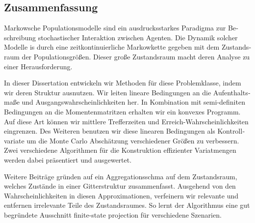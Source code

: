 \begin{otherlanguage}{ngerman}
\chapter*{Zusammenfassung}
Markowsche Populationsmodelle sind ein ausdrucksstarkes Paradigma zur Beschreibung stochastischer Interaktion zwischen Agenten.
Die Dynamik solcher Modelle is durch eine zeitkontinuierliche Markowkette gegeben mit dem Zustandsraum der Populationsgrößen.
Dieser große Zustandsraum macht deren Analyse zu einer Herausforderung.

In dieser Dissertation entwickeln wir Methoden für diese Problemklasse, indem wir deren Struktur ausnutzen.
Wir leiten lineare Bedingungen an die Aufenthaltsmaße und Ausgangswahrscheinlichkeiten her.
In Kombination mit semi-definiten Bedingungen an die Momentenmatritzen erhalten wir ein konvexes Programm.
Auf diese Art können wir mittlere Trefferzeiten und Erreich-Wahrscheinlichkeiten eingrenzen.
Des Weiteren benutzen wir diese linearen Bedingungen als Kontrollvariate um die Monte Carlo Abschätzung verschiedener Größen zu verbessern.
Zwei verschiedene Algorithmen für die Konstruktion effizienter Variatmengen werden dabei präsentiert und ausgewertet.

Weitere Beiträge gründen auf ein Aggregationsschma auf dem Zustandsraum, welches Zustände in einer Gitterstruktur zusammenfasst.
Ausgehend von den Wahrscheinlichkeiten in diesen Approximationen, verfeinern wir relevante und entfernen irrelevante Teile des Zustandsraumes.
    So lernt der Algorithmus eine gut begründete Ausschnitt \glqq finite-state projection\grqq{} für verschiedene Szenarien.
\end{otherlanguage}


\vfill
